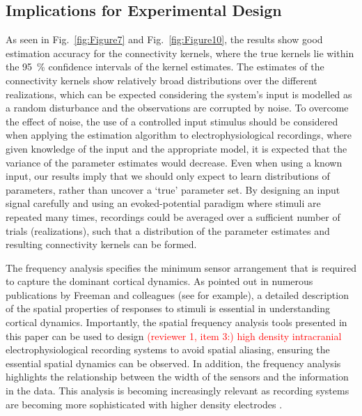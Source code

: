 \documentclass[review,authoryear,3p]{elsarticle}
\newcommand{\dean}[1]{\textcolor{red}{#1}}
\begin{document}
\subsection{Implications for Experimental Design}
As seen in Fig.~\ref{fig:Figure7} and Fig.~\ref{fig:Figure10}, the results show good estimation accuracy for the connectivity kernels, where the true kernels lie within the 95~\% confidence intervals of the kernel estimates. The estimates of the connectivity kernels show relatively broad distributions over the different realizations, which can be expected considering the system's input is modelled as a random disturbance and the observations are corrupted by noise. To overcome the effect of noise, the use of a controlled input stimulus should be considered when applying the estimation algorithm to electrophysiological recordings, where given knowledge of the input and the appropriate model, it is expected that the variance of the parameter estimates would decrease. Even when using a known input, our results imply that we should only expect to learn distributions of parameters, rather than uncover a `true' parameter set. By designing an input signal carefully and using an evoked-potential paradigm where stimuli are repeated many times, recordings could be averaged over a sufficient number of trials (realizations), such that a distribution of the parameter estimates and resulting connectivity kernels can be formed.

The frequency analysis specifies the minimum sensor arrangement that is required to capture the dominant cortical dynamics. As pointed out in numerous publications by Freeman and colleagues (see \citet{Freeman1987} for example), a detailed description of the spatial properties of responses to stimuli is essential in understanding cortical dynamics. Importantly, the spatial frequency analysis tools presented in this paper can be used to design \dean{(reviewer 1, item 3:) high density intracranial} electrophysiological recording systems to avoid spatial aliasing, ensuring the essential spatial dynamics can be observed. In addition, the frequency analysis highlights the relationship between the width of the sensors and the information in the data. This analysis is becoming increasingly relevant as recording systems are becoming more sophisticated with higher density electrodes \citep{Brinkmann2009}.
\end{document}
